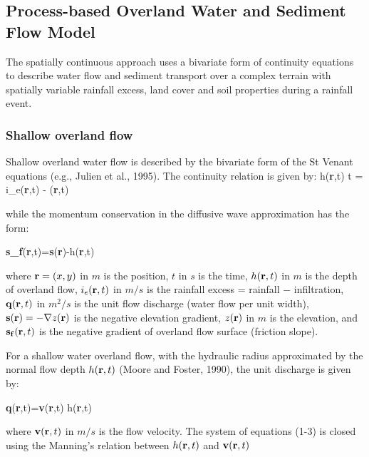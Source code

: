 \documentclass{kapedbk} %
\begin{document}
\bigskip \medskip \noindent
\subsection{Process-based Overland Water and Sediment Flow Model}

\medskip
The spatially continuous approach uses a bivariate form of continuity
equations to describe water flow and sediment transport over a complex
terrain with spatially variable rainfall excess, land cover and soil
properties during a rainfall event.

\medskip
\noindent
\subsubsection{Shallow overland flow}

\quad

\medskip
Shallow overland water flow is described by the bivariate form of the St Venant
 equations  (e.g., Julien et al., 1995).  The continuity relation is given by:
\leftequation
{\partial h({\bf r},t) \over \partial t} =
 i_e({\bf r},t) - \nabla {}({\bf r},t)
\endleftequation

\noindent
while the momentum conservation in the diffusive wave approximation
has the form:

\leftequation
{\bf s_f}({\bf r},t)={\bf s}({\bf r})-\nabla h({\bf r},t)
\endleftequation

\noindent
 where ${\bf r}=(x,y)$ in $m$ is the position,
$t$ in $s$ is the time,
$h({\bf r},t)$ in $m$ is the depth of overland flow,
$i_e({\bf r},t)$ in $m/s$ is the
rainfall excess = rainfall $-$ infiltration,
${\bf q}({\bf r},t)$ in $m^2/s$ is the unit flow discharge
(water flow per unit width),
${\bf s}({\bf r})= - \nabla z({\bf r})$ is the negative elevation
gradient,
$z({\bf r})$ in $m$ is the elevation,
and ${\bf s_f}({\bf r},t)$ is the negative gradient of
overland flow surface (friction slope).

For a shallow water
overland flow, with the hydraulic radius approximated
by the normal flow depth $h({\bf r},t)$ (Moore and Foster, 1990),
the unit discharge is given by:

\leftequation
{\bf q}({\bf r},t)={\bf v}({\bf r},t) h({\bf r},t)
\endleftequation

\noindent
where ${\bf v}({\bf r},t)$  in $m/s$ is the flow velocity.
The system of equations (1-3) is closed
using the Manning's relation between $h({\bf r},t)$ and
 ${\bf v}({\bf r},t)$
\end{document}
